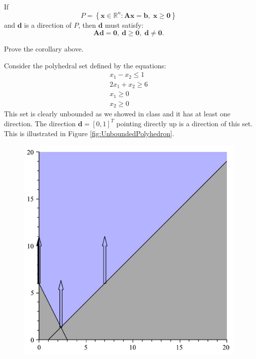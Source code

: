 \begin{corollary} If 
\begin{equation}
P = \left\{\mathbf{x} \in \mathbb{R}^n : \mathbf{A} \mathbf{x} = \mathbf{b},\;\mathbf{x} \geq \mathbf{0}\right\}
\end{equation}
and $\mathbf{d}$ is a direction of $P$, then $\mathbf{d}$ must satisfy:
\begin{equation}
\mathbf{A}\mathbf{d} = \mathbf{0},\:\mathbf{d} \geq \mathbf{0},\;\mathbf{d} \neq \mathbf{0}. 
\end{equation}
\end{corollary}
\begin{exercise} Prove the corollary above.
\end{exercise}

\begin{example} Consider the polyhedral set defined by the equations:
\begin{gather*}
x_1 - x_2 \leq 1\\
2x_1 + x_2 \geq 6\\
x_1 \geq 0\\
x_2 \geq 0
\end{gather*}
This set is clearly unbounded as we showed in class and it has at least one direction. The direction $\mathbf{d} = [0,1]^T$ pointing directly up is a direction of this set. This is illustrated in Figure \ref{fig:UnboundedPolyhedron}.
\begin{figure}[htbp]
\centering
\includegraphics[scale=0.35]{UnboundedPolyhedron.pdf}

\end{figure}
\end{example}
